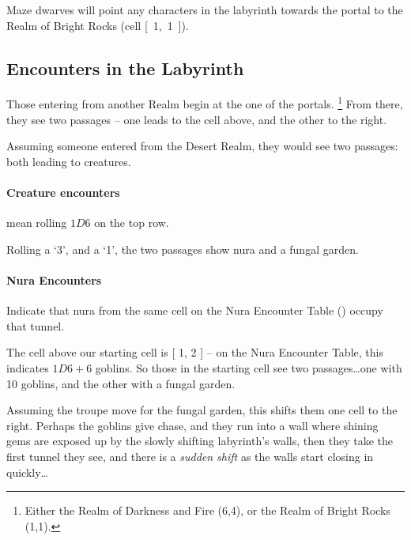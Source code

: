 \begin{multicols}{2}
Maze dwarves will point any characters in the labyrinth towards the portal to the Realm of Bright Rocks (cell \mbox{[ 1, 1 ]}).

\subsection{Encounters in the Labyrinth}
\label{labyrinth}

Those entering from another Realm begin at the one of the portals.
\footnote{Either the Realm of Darkness and Fire (6,4), or the Realm of Bright Rocks (1,1).}
From there, they see two passages -- one leads to the cell above, and the other to the right.

\begin{exampletext}
  Assuming someone entered from the Desert Realm, they would see two passages: both leading to creatures.
\end{exampletext}

\paragraph{Creature encounters}
mean rolling $1D6$ on the top row.

\begin{exampletext}
  Rolling a `3', and a `1', the two passages show nura and a fungal garden.
\end{exampletext}

\paragraph{Nura Encounters}
Indicate that nura from the same cell on the Nura Encounter Table () occupy that tunnel.

\begin{exampletext}
  The cell above our starting cell is [ 1, 2 ] -- on the Nura Encounter Table, this indicates $1D6+6$ goblins.
  So those in the starting cell see two passages\ldots one with 10 goblins, and the other with a fungal garden.

  Assuming the troupe move for the fungal garden, this shifts them one cell to the right.
  Perhaps the goblins give chase, and they run into a wall where shining gems are exposed up by the slowly shifting labyrinth's walls, then they take the first tunnel they see, and there is a \textit{sudden shift} as the walls start closing in quickly\ldots
\end{exampletext}


\end{multicols}
